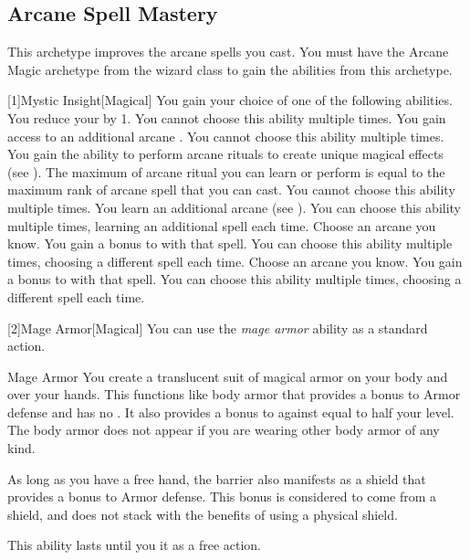     \subsection{Arcane Spell Mastery}
        This archetype improves the arcane spells you cast.
        You must have the Arcane Magic archetype from the wizard class to gain the abilities from this archetype.

        [1]{Mystic Insight}[Magical]
        You gain your choice of one of the following abilities.
        {
             You reduce your  by 1.
                You cannot choose this ability multiple times.
             You gain access to an additional arcane .
                You cannot choose this ability multiple times.
             You gain the ability to perform arcane rituals to create unique magical effects (see ).
                The maximum  of arcane ritual you can learn or perform is equal to the maximum rank of arcane spell that you can cast.
                You cannot choose this ability multiple times.
             You learn an additional arcane  (see ).
                You can choose this ability multiple times, learning an additional spell each time.
             Choose an arcane  you know.
                You gain a  bonus to  with that spell.
                You can choose this ability multiple times, choosing a different spell each time.
             Choose an arcane  you know.
                You gain a  bonus to  with that spell.
                You can choose this ability multiple times, choosing a different spell each time.
        }

        [2]{Mage Armor}[Magical] You can use the \textit{mage armor} ability as a standard action.
        \begin{freeability}{Mage Armor}
            You create a translucent suit of magical armor on your body and over your hands.
            This functions like body armor that provides a  bonus to Armor defense and has no .
            It also provides a bonus to  against  equal to half your level.
            The body armor does not appear if you are wearing other body armor of any kind.

            As long as you have a free hand, the barrier also manifests as a shield that provides a  bonus to Armor defense.
            This bonus is considered to come from a shield, and does not stack with the benefits of using a physical shield.

            This ability lasts until you  it as a free action.
        \end{freeability}


